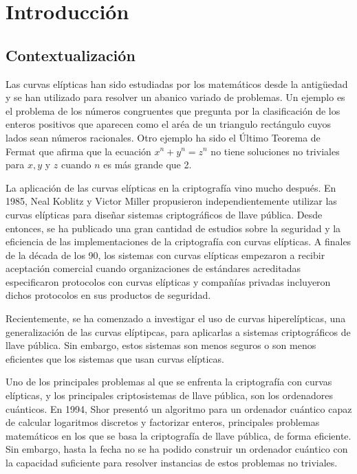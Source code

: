 \chapter{Introducción}
\label{ch:Introducción}

\section{Contextualización}
\label{sub:Contextualización}


Las curvas elípticas han sido estudiadas por los matemáticos desde la antigüedad y se han utilizado para resolver un abanico variado de problemas. Un ejemplo es el problema de los números congruentes que pregunta por la clasificación de los enteros positivos que aparecen como el aréa de un triangulo rectángulo cuyos lados sean números racionales. Otro ejemplo ha sido el Último Teorema de Fermat que afirma que la ecuación $x^n + y^n = z^n$ no tiene soluciones no triviales para $x, y$ y $z$ cuando $n$ es más grande que 2.

La aplicación de las curvas elípticas en la criptografía vino mucho después. En 1985, Neal Koblitz y Victor Miller propusieron independientemente utilizar las curvas elípticas para diseñar sistemas criptográficos de llave pública. Desde entonces, se ha publicado una gran cantidad de estudios sobre la seguridad y la eficiencia de las implementaciones de la criptografía con curvas elípticas. A finales de la década de los 90, los sistemas con curvas elípticas empezaron a recibir aceptación comercial cuando organizaciones de estándares acreditadas especificaron protocolos con curvas elípticas y compañías privadas incluyeron dichos protocolos en sus productos de seguridad.

Recientemente, se ha comenzado a investigar el uso de curvas hiperelípticas, una generalización de las curvas elíptipcas, para aplicarlas a sistemas criptográficos de llave pública. Sin embargo, estos sistemas son menos seguros o son menos eficientes que los sistemas que usan curvas elípticas.

Uno de los principales problemas al que se enfrenta la criptografía con curvas elípticas, y los principales criptosistemas de llave pública, son los ordenadores cuánticos. En 1994, Shor presentó un algoritmo para un ordenador cuántico capaz de calcular logaritmos discretos y factorizar enteros, principales problemas matemáticos en los que se basa la criptografía de llave pública, de forma eficiente. Sin embargo, hasta la fecha no se ha podido construir un ordenador cuántico con la capacidad suficiente para resolver instancias de estos problemas no triviales.

